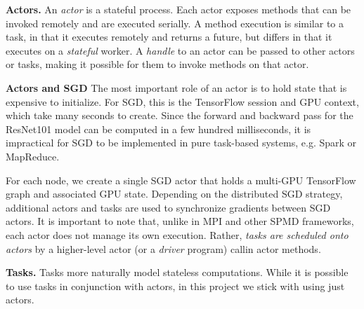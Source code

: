 \documentclass{article}
\begin{document}
{\bf Actors.} An \emph{actor} is a stateful process. Each actor exposes methods that
can be invoked remotely and are executed serially.
A method execution is similar to a task, in that it executes remotely and returns a future, but differs in that it executes on
a {\em stateful} worker. A {\em handle} to an actor can be passed to other actors or
tasks, making it possible for them to invoke methods on that actor.

\textbf{Actors and SGD}
The most important role of an actor is to hold state that is expensive to initialize. For SGD, this is the TensorFlow session and GPU context, which take many seconds to create. Since the forward and backward pass for the ResNet101 model can be computed in a few hundred milliseconds, it is impractical for SGD to be implemented in pure task-based systems, e.g. Spark or MapReduce.

For each node, we create a single SGD actor that holds a multi-GPU TensorFlow graph and associated GPU state. Depending on the distributed SGD strategy, additional actors and tasks are used to synchronize gradients between SGD actors. It is important to note that, unlike in MPI and other SPMD frameworks, each actor does not manage its own execution. Rather, \textit{tasks are scheduled onto actors} by a higher-level actor (or a \textit{driver} program) callin actor methods.

{\bf Tasks.} Tasks more naturally model stateless computations. While it is possible to use tasks in conjunction with actors, in this project we stick with using just actors.

\end{document}
